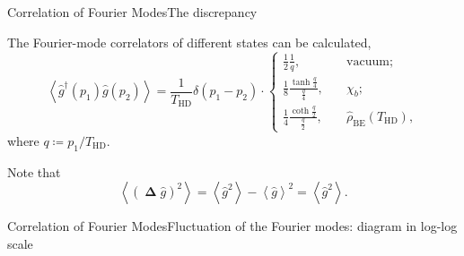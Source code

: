 \documentclass{beamer}
\newcommand{\pp}{{\Bbbpi}}
\newcommand{\rbr}[1]{{\left(#1\right)}}
\newcommand{\abr}[1]{{\left<#1\right>}}
\newcommand{\rfun}[2]{{#1}\mathopen{}\left(#2\right)\mathclose{}}
\newcommand{\what}[1]{{\widehat{#1}}}
\begin{document}
\begin{frame}{Correlation of Fourier Modes}{The discrepancy}

The Fourier-mode correlators of different states can be calculated,
\begin{equation}
\abr{\rfun{\what{g}^\dagger}{p_1}\rfun{\what{g}}{p_2}} =
\frac{1}{T_\text{HD}} \rfun{\delta}{p_1 - p_2} \cdot
\begin{cases}
\frac{1}{2} \frac{1}{q},
&\quad \text{vacuum};\\
\frac{1}{8}\frac{\tanh\frac{q}{4}}{\frac{q}{4}},
&\quad \chi_b; \\
\frac{1}{4} \frac{\coth\frac{q}{2}}{\frac{q}{2}},
&\quad \rfun{\what{\rho}_\text{BE}}{T_\text{HD}},
\end{cases}
\end{equation}
where $q \coloneqq p_1/T_\text{HD}$.

Note that
\begin{equation}
\abr{\rbr{\mbfDelta\what{g}}^2} = \abr{\what{g}^2} - \abr{\what{g}}^2 = 
\abr{\what{g}^2} .
\end{equation}
\end{frame}

\begin{frame}{Correlation of Fourier Modes}{Fluctuation of the Fourier 
modes: diagram in log-log scale}

\begin{center}

\end{center}

\end{frame}
\end{document}
